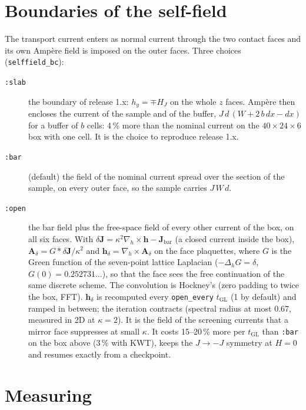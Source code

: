 \documentclass[11pt,a4paper]{article}
\newcommand{\tGL}{t_{\mathrm{GL}}}
\newcommand{\code}[1]{\texttt{#1}}
\begin{document}
\section{Boundaries of the self-field}
\label{sec:bc}

The transport current enters as normal current through the two contact faces and its own Amp\`ere field is imposed on
the outer faces. Three choices (\code{selffield\_bc}):
\begin{description}
\item[\code{:slab}] the boundary of release 1.x: $h_y = \mp H_J$ on the whole $z$ faces. Amp\`ere then encloses the
  current of the sample and of the buffer, $J\,d\,(W + 2\,b\,dx - dx)$ for a buffer of $b$ cells: 4\,\% more than the
  nominal current on the $40\times24\times6$ box with one cell. It is the choice to reproduce release 1.x.
\item[\code{:bar}] (default) the field of the nominal current spread over the section of the sample, on every outer
  face, so the sample carries $J\,W\,d$.
\item[\code{:open}] the bar field plus the free-space field of every other current of the box, on all six faces. With
  $\delta\mathbf J = \kappa^2\nabla_h\times\mathbf h - \mathbf J_{\mathrm{bar}}$ (a closed current inside the box),
  $\mathbf A_\delta = G * \delta\mathbf J/\kappa^2$ and $\mathbf h_\delta = \nabla_h\times\mathbf A_\delta$ on the face
  plaquettes, where $G$ is the Green function of the seven-point lattice Laplacian ($-\Delta_h G = \delta$, $G(0) =
  0.252731\ldots$), so that the face sees the free continuation of the same discrete scheme. The convolution is
  Hockney's (zero padding to twice the box, FFT). $\mathbf h_\delta$ is recomputed every \code{open\_every} $\tGL$ (1 by
  default) and ramped in between; the iteration contracts (spectral radius at most 0.67, measured in 2D at $\kappa =
  2$). It is the field of the screening currents that a mirror face suppresses at small $\kappa$. It costs 15--20\,\% more
  per $\tGL$ than \code{:bar} on the box above ($3\,\%$ with KWT), keeps the $J\to-J$ symmetry at $H = 0$ and resumes
  exactly from a checkpoint.
\end{description}

\section{Measuring}
\end{document}
